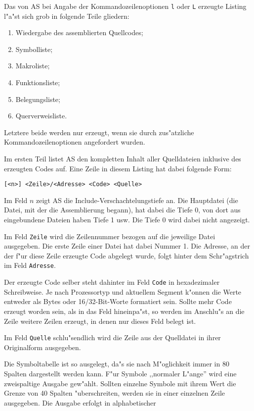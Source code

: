 \documentclass[12pt,a4paper,twoside]{report}
\newcommand{\tty}[1]{{\tt #1}}
\begin{document}
Das von AS bei Angabe der Kommandozeilenoptionen \tty{l} oder \tty{L}
erzeugte Listing l"a"st sich grob in folgende Teile gliedern:
\begin{enumerate}
\item{Wiedergabe des assemblierten Quellcodes;}
\item{Symbolliste;}
\item{Makroliste;}
\item{Funktionsliste;}
\item{Belegungsliste;}
\item{Querverweisliste.}
\end{enumerate}
Letztere beide werden nur erzeugt, wenn sie durch zus"atzliche
Kommandozeilenoptionen angefordert wurden.
\par
Im ersten Teil listet AS den kompletten Inhalt aller Quelldateien inklusive
des erzeugten Codes auf.  Eine Zeile in diesem Listing hat dabei folgende Form:
\begin{verbatim}
[<n>] <Zeile>/<Adresse> <Code> <Quelle>
\end{verbatim}
Im Feld $n$ zeigt AS die Include-Verschachtelungstiefe an.  Die
Hauptdatei (die Datei, mit der die Assemblierung begann), hat dabei die
Tiefe 0, von dort aus eingebundene Dateien haben Tiefe 1 usw.  Die Tiefe
0 wird dabei nicht angezeigt.
\par
Im Feld \tty{Zeile} wird die Zeilennummer bezogen auf die jeweilige Datei
ausgegeben.  Die erste Zeile einer Datei hat dabei Nummer 1.  Die Adresse,
an der der f"ur diese Zeile erzeugte Code abgelegt wurde, folgt hinter dem
Schr"agstrich im Feld \tty{Adresse}.
\par
Der erzeugte Code selber steht dahinter im Feld \tty{Code} in
hexadezimaler Schreibweise.  Je nach Prozessortyp und aktuellem Segment
k"onnen die Werte entweder als Bytes oder 16/32-Bit-Worte formatiert sein.
Sollte mehr Code erzeugt worden sein, als in das Feld hineinpa"st, so
werden im Anschlu"s an die Zeile weitere Zeilen erzeugt, in denen nur
dieses Feld belegt ist.
\par
Im Feld \tty{Quelle} schlu"sendlich wird die Zeile aus der Quelldatei in
ihrer Originalform ausgegeben.
\par
Die Symboltabelle ist so ausgelegt, da"s sie nach M"oglichkeit immer in 80
Spalten dargestellt werden kann.  F"ur Symbole ,,normaler L"ange'' wird
eine zweispaltige Ausgabe gew"ahlt.  Sollten einzelne Symbole mit ihrem
Wert die Grenze von 40 Spalten "uberschreiten, werden sie in einer
einzelnen Zeile ausgegeben.  Die Ausgabe erfolgt in alphabetischer
\end{document}

